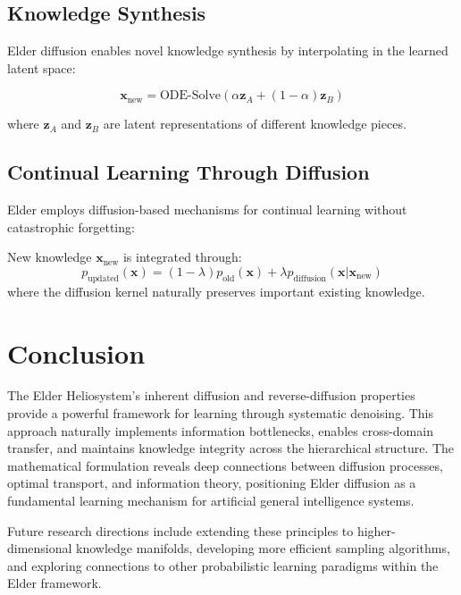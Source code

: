 \subsection{Knowledge Synthesis}

Elder diffusion enables novel knowledge synthesis by interpolating in the learned latent space:

\begin{equation}
\mathbf{x}_{\text{new}} = \text{ODE-Solve}(\alpha \mathbf{z}_A + (1-\alpha) \mathbf{z}_B)
\end{equation}

where $\mathbf{z}_A$ and $\mathbf{z}_B$ are latent representations of different knowledge pieces.

\subsection{Continual Learning Through Diffusion}

Elder employs diffusion-based mechanisms for continual learning without catastrophic forgetting:

\begin{definition}
New knowledge $\mathbf{x}_{\text{new}}$ is integrated through:
\begin{equation}
p_{\text{updated}}(\mathbf{x}) = (1-\lambda) p_{\text{old}}(\mathbf{x}) + \lambda p_{\text{diffusion}}(\mathbf{x} | \mathbf{x}_{\text{new}})
\end{equation}
where the diffusion kernel naturally preserves important existing knowledge.
\end{definition}

\section{Conclusion}

The Elder Heliosystem's inherent diffusion and reverse-diffusion properties provide a powerful framework for learning through systematic denoising. This approach naturally implements information bottlenecks, enables cross-domain transfer, and maintains knowledge integrity across the hierarchical structure. The mathematical formulation reveals deep connections between diffusion processes, optimal transport, and information theory, positioning Elder diffusion as a fundamental learning mechanism for artificial general intelligence systems.

Future research directions include extending these principles to higher-dimensional knowledge manifolds, developing more efficient sampling algorithms, and exploring connections to other probabilistic learning paradigms within the Elder framework.